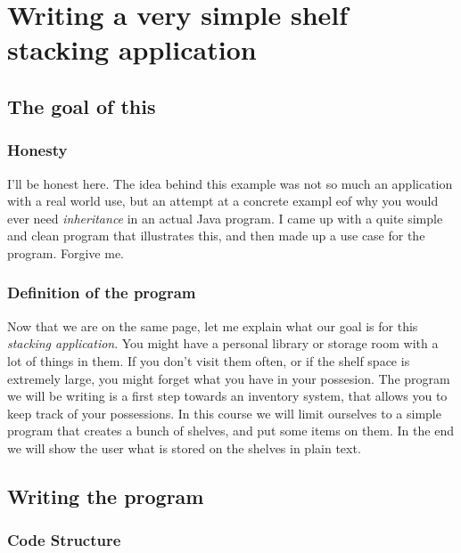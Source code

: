 \documentclass[11pt,fleqn]{book} %
\begin{document}
\newpage
\section{Writing a very simple shelf stacking application}

\subsection{The goal of this}
\subsubsection{Honesty} I'll be honest here. The idea behind this example was not so much an application with a real world use, but an attempt at a concrete exampl eof why you would ever need \emph{inheritance} in an actual Java program. I came up with a quite simple and clean program that illustrates this, and then made up a use case for the program. Forgive me. 

\subsubsection{Definition of the program} Now that we are on the same page, let me explain what our goal is for this \emph{stacking application}. You might have a personal library or storage room with a lot of things in them. If you don't visit them often, or if the shelf space is extremely large, you might forget what you have in your possesion. The program we will be writing is a first step towards an inventory system, that allows you to keep track of your possessions.
In this course we will limit ourselves to a simple program that creates a bunch of shelves, and put some items on them. In the end we will show the user what is stored on the shelves in plain text.

\subsection{Writing the program}
\subsubsection{Code Structure}
\end{document}
